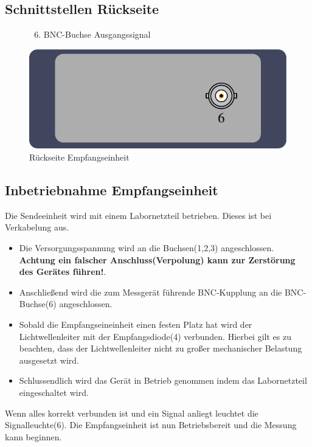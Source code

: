 \documentclass[10pt,a4paper]{scrartcl}
\begin{document}
\subsection{Schnittstellen Rückseite}
\begin{figure}[H]
\begin{minipage}[t]{6cm}
\vspace{0pt}
\begin{enumerate}
\setcounter{enumi}{5}
\item BNC-Buchse Ausgangssignal
\end{enumerate}
\end{minipage}
\hfill
\begin{minipage}[t]{6.5cm}
\vspace{0pt}
\includegraphics[scale=0.7]{gfx/rx-back.pdf}
\caption{Rückseite Empfangseinheit}
\label{fig:Bild4}
\end{minipage}
\end{figure}

\subsection{Inbetriebnahme Empfangseinheit}
Die Sendeeinheit wird mit einem Labornetzteil betrieben. Dieses ist bei Verkabelung aus.
\begin{itemize}
\item Die Versorgungsspannung wird an die Buchsen(1,2,3) angeschlossen. \textbf{Achtung ein falscher Anschluss(Verpolung) kann zur Zerstörung des Gerätes führen!}.
\item Anschließend wird die zum Messgerät führende BNC-Kupplung an die BNC-Buchse(6) angeschlossen.
\item Sobald die Empfangseineinheit einen festen Platz hat wird der Lichtwellenleiter mit der Empfangsdiode(4) verbunden. Hierbei gilt es zu beachten, dass der Lichtwellenleiter nicht zu großer mechanischer Belastung ausgesetzt wird.
\item Schlussendlich wird das Gerät in Betrieb genommen indem das Labornetzteil eingeschaltet wird.
\end{itemize}
Wenn alles korrekt verbunden ist und ein Signal anliegt leuchtet die Signalleuchte(6). Die Empfangseinheit ist nun Betriebsbereit und die Messung kann beginnen.
\end{document}
